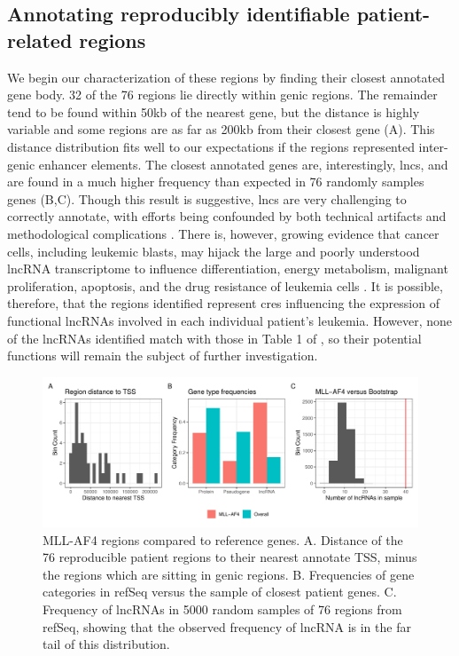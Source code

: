 \subsection{Annotating reproducibly identifiable patient-related regions}

We begin our characterization of these regions by finding their closest annotated gene body. 32 of the 76 regions lie directly within genic regions. The remainder tend to be found within 50kb of the nearest gene, but the distance is highly variable and some regions are as far as 200kb from their closest gene (A). This distance distribution fits well to our expectations if the regions represented inter-genic enhancer elements.  The closest annotated genes are, interestingly, \glspl{lnc}, and are found in a much higher frequency than expected in 76 randomly samples genes (B,C). Though this result is suggestive, \glspl{lnc} are very challenging to correctly annotate, with efforts being confounded by both technical artifacts and methodological complications \cite[see Figure 1 for an overview of challenges associated with lncRNA annotation]{Cao2018}. There is, however, growing evidence that cancer cells, including leukemic blasts, may hijack the large and poorly understood lncRNA transcriptome to influence differentiation, energy metabolism, malignant proliferation, apoptosis, and the drug resistance of leukemia cells \cite[Table 1]{Gao2020}. It is possible, therefore, that the regions identified represent \glspl{cre} influencing the expression of functional lncRNAs involved in each individual patient's leukemia. However, none of the lncRNAs identified match with those in Table 1 of \textcite{Gao20202}, so their potential functions will remain the subject of further investigation.

\begin{figure}
    \centering
    \includegraphics[width=\textwidth]{plot/ch5/mll_lnc.pdf}
    \caption{MLL-AF4 regions compared to reference genes. A. Distance of the 76 reproducible patient regions to their nearest annotate TSS, minus the regions which are sitting in genic regions. B. Frequencies of gene categories in refSeq versus the sample of closest patient genes. C. Frequency of lncRNAs in 5000 random samples of 76 regions from refSeq, showing that the observed frequency of lncRNA is in the far tail of this distribution.}
    \label{fig:mll_lnc}
\end{figure}

